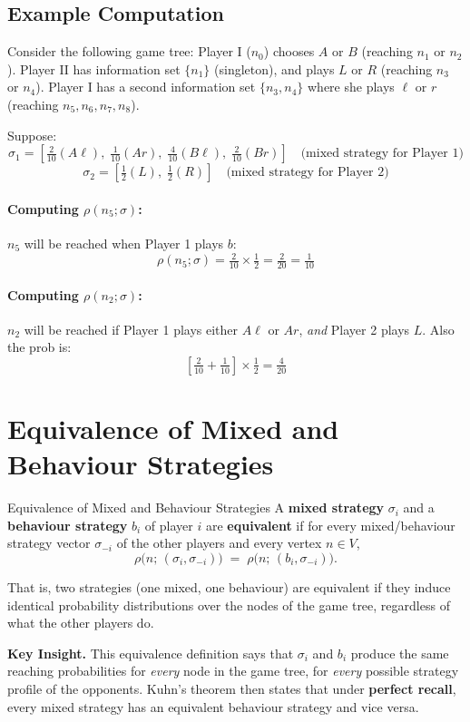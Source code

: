 \documentclass[12pt, a4paper]{article}
\begin{document}
\subsection{Example Computation}

Consider the following game tree: Player I ($n_0$) chooses $A$ or $B$ (reaching $n_1$ or $n_2$). Player II has information set $\{n_1\}$ (singleton), and plays $L$ or $R$ (reaching $n_3$ or $n_4$). Player I has a second information set $\{n_3, n_4\}$ where she plays $\ell$ or $r$ (reaching $n_5, n_6, n_7, n_8$).

Suppose:
\[
  \sigma_1 = \left[\tfrac{2}{10}(A\ell),\; \tfrac{1}{10}(Ar),\; \tfrac{4}{10}(B\ell),\; \tfrac{2}{10}(Br)\right]
  \quad \text{(mixed strategy for Player 1)}
\]
\[
  \sigma_2 = \left[\tfrac{1}{2}(L),\; \tfrac{1}{2}(R)\right]
  \quad \text{(mixed strategy for Player 2)}
\]

\paragraph{Computing $\rho(n_5; \sigma)$:}
$n_5$ will be reached when Player 1 plays $b$:
\[
  \rho(n_5; \sigma) = \tfrac{2}{10} \times \tfrac{1}{2} = \tfrac{2}{20} = \tfrac{1}{10}
\]

\paragraph{Computing $\rho(n_2; \sigma)$:}
$n_2$ will be reached if Player 1 plays either $A\ell$ or $Ar$, \emph{and} Player 2 plays $L$. Also the prob is:
\[
  \left[\tfrac{2}{10} + \tfrac{1}{10}\right] \times \tfrac{1}{2} = \tfrac{4}{20}
\]

\section{Equivalence of Mixed and Behaviour Strategies}

\begin{defbox}{Equivalence of Mixed and Behaviour Strategies}
A \textbf{mixed strategy} $\sigma_i$ and a \textbf{behaviour strategy} $b_i$ of player $i$ are \textbf{equivalent} if for every mixed/behaviour strategy vector $\sigma_{-i}$ of the other players and every vertex $n \in V$,
\[
  \rho\bigl(n;\, (\sigma_i, \sigma_{-i})\bigr) \;=\; \rho\bigl(n;\, (b_i, \sigma_{-i})\bigr).
\]
\end{defbox}

That is, two strategies (one mixed, one behaviour) are equivalent if they induce identical probability distributions over the nodes of the game tree, regardless of what the other players do.

\begin{takebox}
\textbf{Key Insight.} This equivalence definition says that $\sigma_i$ and $b_i$ produce the same reaching probabilities for \emph{every} node in the game tree, for \emph{every} possible strategy profile of the opponents. Kuhn's theorem then states that under \textbf{perfect recall}, every mixed strategy has an equivalent behaviour strategy and vice versa.
\end{takebox}
\end{document}
